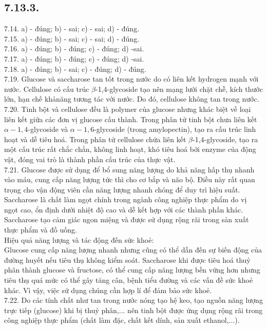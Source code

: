 \documentclass[10pt]{article}
\begin{document}
\subsection*{7.13.3.}
7.14. a) - đúng; b) - sai; c) - sai; d) - đúng.\\
7.15. a) - đúng; b) - sai; c) - sai; d) - đúng.\\
7.16. a) - đúng; b) - đúng; c) - đúng; d) -sai.\\
7.17. a) - đúng; b) - đúng; c) - đúng; d) -sai.\\
7.18. a) - đúng; b) - sai; c) - đúng; d) - đúng.\\
7.19. Glucose và saccharose tan tốt trong nước do có liên kết hydrogen mạnh với nước. Cellulose có cấu trúc $\beta$-1,4-glycoside tạo nên mạng lưới chặt chễ, kích thước lớn, hạn chế khảnăng tương tác với nước. Do đó, cellulose không tan trong nước.\\
7.20. Tinh bột và cellulose đều là polymer của glucose nhưng khác biệt về loại liên kết giữa các đơn vị glucose cấu thành. Trong phân tử tinh bột chưa liên kết $\alpha-1,4$-glycoside và $\alpha-1,6$-glycoside (trong amylopectin), tạo ra cấu trúc linh hoạt và dễ tiêu hoá. Trong phân tử cellulose chứa liên kết $\beta$-1,4-glycoside, tạo ra một cấu trúc rất chắc chẳn, không linh hoạt, khó tiêu hoá bởi enzyme của động vật, đóng vai trò là thành phần cấu trúc của thực vật.\\
7.21. Glucose được sử dụng để bổ sung năng lượng do khả năng hấp thụ nhanh vào máu, cung cấp năng lượng tức thì cho cơ bắp và não bộ. Điều này rất quan trọng cho vận động viên cần năng lượng nhanh chóng để duy trì hiệu suất.\\
Saccharose là chất làm ngọt chính trong ngành công nghiệp thực phẩm do vị ngọt cao, ổn định dưới nhiệt độ cao và dễ kết hợp với các thành phần khác. Saccharose tạo cảm giác ngon miệng và được sử dụng rộng rãi trong sản xuất thực phẩm và đồ uống.\\
Hiệu quả năng lượng và tác động đến sức khoẻ:\\
Glucose cung cấp năng lượng nhanh nhưng cũng có thể dẫn đến sự biến động của đường huyết nếu tiêu thụ không kiểm soát. Saccharose khi được tiêu hoá thuỷ phân thành glucose và fructose, có thể cung cấp năng lượng bền vững hơn nhưng tiêu thụ quá mức có thể gây tăng cân, bệnh tiểu đường và các vấn đề sức khoẻ khác. Vì vậy, việc sử dụng chúng cần hợp lí để đảm bảo sức khoẻ.\\
7.22. Do các tính chất như tan trong nước nóng tạo hệ keo, tạo nguồn năng lượng trực tiếp (glucose) khi bị thuỷ phân,... nên tinh bột được ứng dụng rộng rãi trong công nghiệp thực phẩm (chất làm đặc, chất kết dính, sản xuất ethanol,...).
\end{document}
